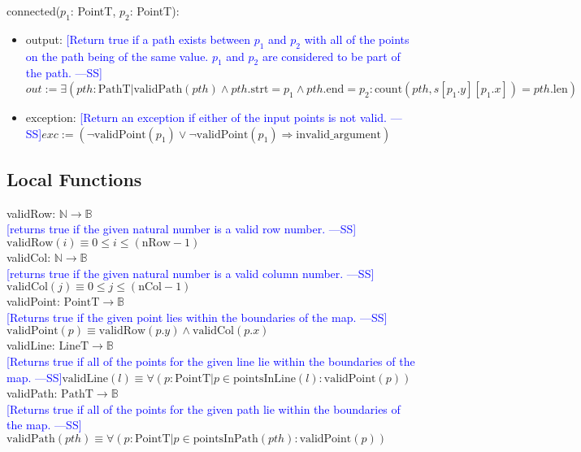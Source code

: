 \documentclass[12pt]{article}
\newcommand{\authornote}[3]{\textcolor{#1}{[#3 ---#2]}}
\newcommand{\authornote}[3]{}
\newcommand{\wss}[1]{\authornote{blue}{SS}{#1}}
\begin{document}
\noindent connected($p_1$: PointT, $p_2$: PointT):
\begin{itemize}
\item output: \wss{Return true if a path exists between $p_1$ and $p_2$ with all
    of the points on the path being of the same value.  $p_1$ and $p_2$ are
    considered to be part of the path.}
  $out := \exists (\mathit{pth}: \mbox{PathT} | \mbox{validPath}(\mathit{pth})
  \wedge \mathit{pth}.\mbox{strt} = p_1 \wedge \mathit{pth}.\mbox{end} = p_2 :
  \mbox{count}(\mathit{pth}, s[p_1.y][p_1.x]) = \mathit{pth}.\mbox{len})$
\item exception: \wss{Return an exception if either of the input points is not
    valid.}$exc := (\neg\mbox{validPoint}(p_1) \vee \neg\mbox{validPoint}(p_1)
  \Rightarrow \mbox{invalid\_argument})$

\end{itemize}

\subsection*{Local Functions}

\noindent validRow: $\mathbb{N} \rightarrow \mathbb{B}$\\
\noindent \wss{returns true if the given natural number is a valid row
  number.}$\mbox{validRow}(i) \equiv 0 \leq i \leq (\mbox{nRow} - 1)$\\

\noindent validCol: $\mathbb{N} \rightarrow \mathbb{B}$\\
\noindent \wss{returns true if the given natural number is a valid column
  number.}$\mbox{validCol}(j) \equiv 0 \leq j \leq (\mbox{nCol} - 1)$\\

\noindent validPoint: $\mbox{PointT} \rightarrow \mathbb{B}$\\
\noindent \wss{Returns true if the given point lies within the boundaries of the
  map.}$\mbox{validPoint}(p) \equiv \mbox{validRow}(p.y) \wedge \mbox{validCol}(p.x)$\\

\noindent validLine: $\mbox{LineT} \rightarrow \mathbb{B}$\\
\noindent \wss{Returns true if all of the points for the given line lie within the boundaries of the
  map.}$\mbox{validLine}(l) \equiv \forall(p: \mbox{PointT} | p \in \mbox{pointsInLine}(l):
  \mbox{validPoint}(p))$\\

\noindent validPath: $\mbox{PathT} \rightarrow \mathbb{B}$\\
\noindent \wss{Returns true if all of the points for the given path lie within the boundaries of the
  map.}$\mbox{validPath}(\mathit{pth}) \equiv \forall(p: \mbox{PointT} | p \in \mbox{pointsInPath}(\mathit{pth}):
  \mbox{validPoint}(p))$\\
\end{document}
